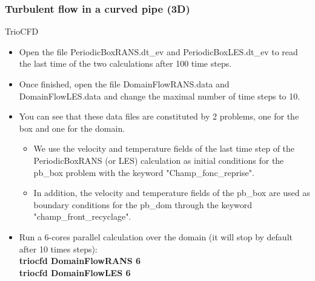 \documentclass[10pt, hyperref={unicode=true,pdfusetitle, bookmarks=true,bookmarksnumbered=false,bookmarksopen=false, breaklinks=false,pdfborder={0 0l 1},backref=true,colorlinks=true,linkcolor=darkblue,pageanchor}]{beamer}
\begin{document}
\begin{frame}
\frametitle{Turbulent flow in a curved pipe (3D)}
\begin{block}{TrioCFD}

\begin{itemize}
\item Open the file PeriodicBoxRANS.dt\_ev and PeriodicBoxLES.dt\_ev to read the last time of the two calculations after 100 time steps.

\item Once finished, open the file DomainFlowRANS.data and DomainFlowLES.data and change the maximal number of time steps to 10.

\item You can see that these data files are constituted by 2 problems, one for the box and one for the domain.
    \begin {itemize}
    \item We use the velocity and temperature fields of the last time step of the PeriodicBoxRANS (or LES) calculation as initial conditions for the pb\_box problem with the keyword "Champ\_fonc\_reprise".
    \item In addition, the velocity and temperature fields of the pb\_box are used as boundary conditions for the pb\_dom through the keyword "champ\_front\_recyclage".
    \end{itemize}

\item Run a 6-cores parallel calculation over the domain (it will stop by default after 10 times steps):\\
\textbf{triocfd DomainFlowRANS 6}\\
\textbf{triocfd DomainFlowLES 6}

\end{itemize}

\end{block}
\end{frame}
\end{document}
